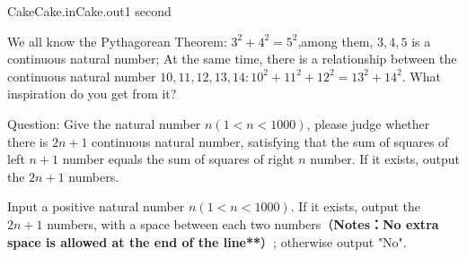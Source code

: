 \begin{problem}{Cake}{Cake.in}{Cake.out}{1 second}

We all know the Pythagorean Theorem: $3^2 + 4^2 = 5^2$,among them, $3,4,5$ is a continuous natural number; At the same time, there is a relationship between the continuous natural number $10,11,12,13,14: 10^2+11^2+12^2=13^2+14^2$. What inspiration do you get from it?

Question: Give the natural number $n (1 < n < 1000)$, please judge whether there is $2n + 1$ continuous natural number, satisfying that the sum of squares of left $n + 1$ number equals the sum of squares of right $n$ number. If it exists, output the $2n + 1$ numbers.

\InputFile
Input a positive natural number $n (1 < n < 1000)$.
\OutputFile
If it exists, output the $2n+1$ numbers, with a space between each two numbers（{\bfseries Notes：No extra space is allowed at the end of the line**}）; otherwise output "No".

\Example
\begin{example}
%
\end{example}
\end{problem}
